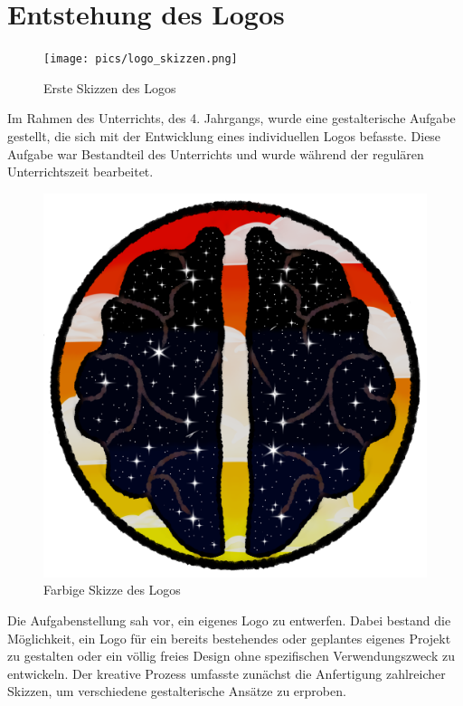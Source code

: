 \section{Entstehung des Logos}


\begin{figure}
    \centering
    \texttt{[image: pics/logo\_skizzen.png]}
    \caption{Erste Skizzen des Logos}
    \label{fig:logo-skizzen}
\end{figure}

Im Rahmen des Unterrichts, des 4. Jahrgangs, wurde eine gestalterische Aufgabe 
gestellt, die sich mit der Entwicklung eines individuellen Logos befasste. Diese 
Aufgabe war Bestandteil des Unterrichts und wurde während der regulären Unterrichtszeit 
bearbeitet. 


\begin{figure}
    \centering
    \includegraphics[scale=0.05]{pics/Farbige Skizze.png}
    \caption{Farbige Skizze des Logos}
    \label{fig:logo-farbige-skizze}
\end{figure}

Die Aufgabenstellung sah vor, ein eigenes Logo zu entwerfen. Dabei bestand die 
Möglichkeit, ein Logo für ein bereits bestehendes oder geplantes eigenes Projekt 
zu gestalten oder ein völlig freies Design ohne spezifischen Verwendungszweck zu 
entwickeln. Der kreative Prozess umfasste zunächst die Anfertigung zahlreicher 
Skizzen, um verschiedene gestalterische Ansätze zu erproben.


